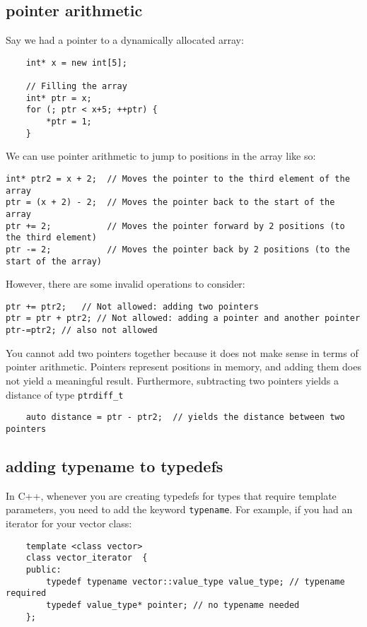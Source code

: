 \documentclass{report}
\begin{document}
    \subsection{pointer arithmetic}
    Say we had a pointer to a dynamically allocated array:
    \begin{verbatim}
    int* x = new int[5];
    
    // Filling the array
    int* ptr = x;
    for (; ptr < x+5; ++ptr) {
        *ptr = 1;
    }
    \end{verbatim}
    We can use pointer arithmetic to jump to positions in the array like so:
    \begin{verbatim}
int* ptr2 = x + 2;  // Moves the pointer to the third element of the array
ptr = (x + 2) - 2;  // Moves the pointer back to the start of the array
ptr += 2;           // Moves the pointer forward by 2 positions (to the third element)
ptr -= 2;           // Moves the pointer back by 2 positions (to the start of the array)
    \end{verbatim}
    However, there are some invalid operations to consider:
    \begin{verbatim}
ptr += ptr2;   // Not allowed: adding two pointers
ptr = ptr + ptr2; // Not allowed: adding a pointer and another pointer
ptr-=ptr2; // also not allowed

    \end{verbatim} \noindent
You cannot add two pointers together because it does not make sense in terms of pointer arithmetic. Pointers represent positions in memory, and adding them does not yield a meaningful result.
\bigbreak \noindent
Furthermore, subtracting two pointers yields a distance of type \texttt{ptrdiff\_t}
\begin{verbatim}
    auto distance = ptr - ptr2;  // yields the distance between two pointers
\end{verbatim}
\subsection{adding typename to typedefs}
In C++, whenever you are creating typedefs for types that require template parameters, you need to add the keyword \texttt{typename}. For example, if you had an iterator for your vector class:
\begin{verbatim}
    template <class vector>
    class vector_iterator  {
    public:
        typedef typename vector::value_type value_type; // typename required
        typedef value_type* pointer; // no typename needed
    };
\end{verbatim}
\end{document}

